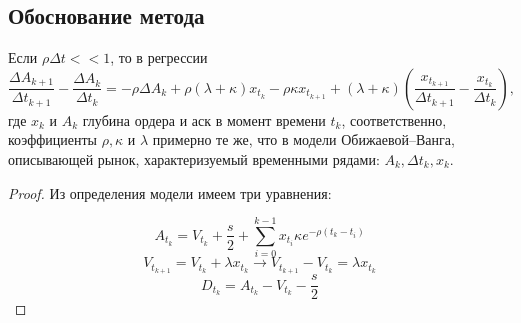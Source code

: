\begin{appendices} %



	\section{Обоснование метода}
        
        \begin{theorem}
                Если $\rho \Delta t << 1$, то в регрессии                                                                                                                                                                                                                                                                                                                                                                                       
                \begin{equation*}
                        \frac{\Delta A_{k+1}}{\Delta t_{k+1}} - \frac{\Delta A_{k}}{\Delta t_{k}}
                        = -\rho \Delta A_k + \rho (\lambda + \kappa) x_{t_k} - \rho \kappa x_{t_{k+1}} + 
                        (\lambda + \kappa) \left(\frac{x_{t_{k+1}}}{\Delta t_{k+1}} - \frac{x_{t_k}}{\Delta t_{k}}\right),
                \end{equation*}
                где $x_{k}$ и $A_{k}$ глубина ордера и аск в момент времени $t_k$, соответственно, \\

                коэффициенты $\rho, \kappa$ и $\lambda$ примерно те же, что в модели Обижаевой--Ванга, описывающей рынок,
                характеризуемый временными рядами: $A_k, \Delta t _k, x_k$.


\end{theorem}
\begin{proof}
        Из определения модели имеем три уравнения:

        \begin{equation} \label{rp1}
                A_{t_k} = V_{t_k} + \frac{s}{2} + \sum _{i=0} ^{k-1} x_{t_i} \kappa e^{- \rho (t_k - t_i)}
        \end{equation}
        \begin{equation}\label{rp2}
                V_{t_{k+1}} = V_{t_k} + \lambda x_{t_k} \rightarrow V_{t_{k+1}} - V_{t_k} = \lambda x_{t_{k}}
        \end{equation}
        \begin{equation} \label{rp3}
                D_{t_k} = A_{t_k} - V_{t_k} - \frac{s}{2}
        \end{equation}


\end{proof}
\end{appendices}
